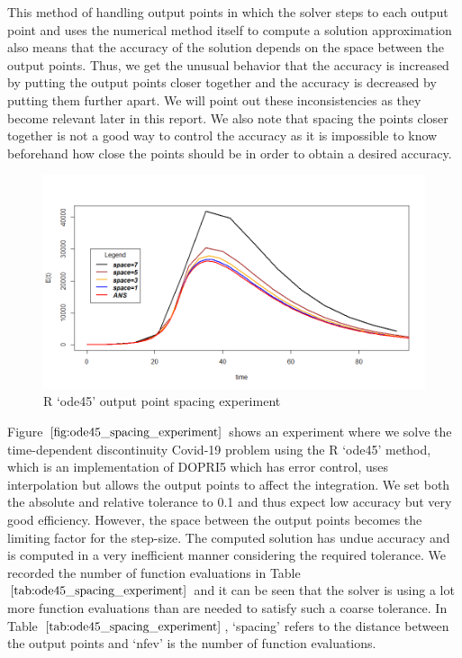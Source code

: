 This method of handling output points in which the solver steps to each output point and uses the numerical method itself to compute a solution approximation also means that the accuracy of the solution depends on the space between the output points. Thus, we get the unusual behavior that the accuracy is increased by putting the output points closer together and the accuracy is decreased by putting them further apart. We will point out these inconsistencies as they become relevant later in this report. We also note that spacing the points closer together is not a good way to control the accuracy as it is impossible to know beforehand how close the points should be in order to obtain a desired accuracy.

\begin{figure}[H]
\centering
\includegraphics[width=0.7\linewidth]{./figures/R_ode45_spacing_experiment}
\caption{R `ode45' output point spacing experiment}
\label{fig:ode45_spacing_experiment}
\end{figure}

Figure $\ref{fig:ode45_spacing_experiment}$ shows an experiment where we solve the time-dependent discontinuity Covid-19 problem using the R `ode45' method, which is an implementation of DOPRI5 which has error control, uses interpolation but allows the output points to affect the integration. We set both the absolute and relative tolerance to 0.1 and thus expect low accuracy but very good efficiency. However, the space between the output points becomes the limiting factor for the step-size. The computed solution has undue accuracy and is computed in a very inefficient manner considering the required tolerance. We recorded the number of function evaluations in Table $\ref{tab:ode45_spacing_experiment}$ and it can be seen that the solver is using a lot more function evaluations than are needed to satisfy such a coarse tolerance. In Table $\ref{tab:ode45_spacing_experiment}$, `spacing' refers to the distance between the output points and `nfev' is the number of function evaluations.

